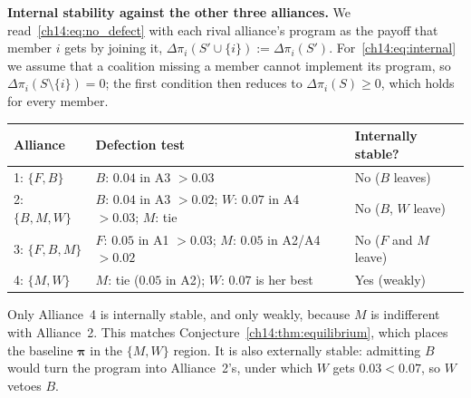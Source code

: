 \documentclass[../solutions_manual.tex]{subfiles}
\begin{document}
\textbf{Internal stability against the other three alliances.} We read~\eqref{ch14:eq:no_defect} with each rival alliance's program as the payoff that member $i$ gets by joining it, $\Delta\pi_i(S' \cup \{i\}) := \Delta\pi_i(S')$. For~\eqref{ch14:eq:internal} we assume that a coalition missing a member cannot implement its program, so $\Delta\pi_i(S\setminus\{i\}) = 0$; the first condition then reduces to $\Delta\pi_i(S) \ge 0$, which holds for every member.
\begin{center}
\footnotesize
\begin{tabular}{lll}
\toprule
Alliance & Defection test & Internally stable? \\
\midrule
1: $\{F,B\}$ & $B$: $0.04$ in A3 $> 0.03$ & No ($B$ leaves) \\
2: $\{B,M,W\}$ & $B$: $0.04$ in A3 $> 0.02$; $W$: $0.07$ in A4 $> 0.03$; $M$: tie & No ($B$, $W$ leave) \\
3: $\{F,B,M\}$ & $F$: $0.05$ in A1 $> 0.03$; $M$: $0.05$ in A2/A4 $> 0.02$ & No ($F$ and $M$ leave) \\
4: $\{M,W\}$ & $M$: tie ($0.05$ in A2); $W$: $0.07$ is her best & Yes (weakly) \\
\bottomrule
\end{tabular}
\end{center}
Only Alliance~4 is internally stable, and only weakly, because $M$ is indifferent with Alliance~2. This matches Conjecture~\ref{ch14:thm:equilibrium}, which places the baseline $\boldsymbol{\pi}$ in the $\{M,W\}$ region. It is also externally stable: admitting $B$ would turn the program into Alliance~2's, under which $W$ gets $0.03 < 0.07$, so $W$ vetoes $B$.
\end{document}
